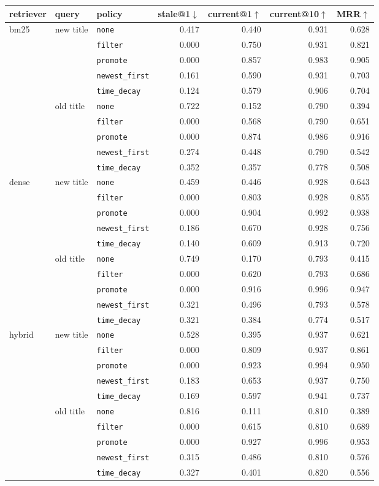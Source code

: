 \begin{tabular}{lllrrrr}
\toprule
retriever & query & policy & stale@1$\downarrow$ & current@1$\uparrow$ & current@10$\uparrow$ & MRR$\uparrow$ \\
\midrule
bm25 & new title & \texttt{none} & 0.417 & 0.440 & 0.931 & 0.628 \\
 &  & \texttt{filter} & 0.000 & 0.750 & 0.931 & 0.821 \\
 &  & \texttt{promote} & 0.000 & 0.857 & 0.983 & 0.905 \\
 &  & \texttt{newest\_first} & 0.161 & 0.590 & 0.931 & 0.703 \\
 &  & \texttt{time\_decay} & 0.124 & 0.579 & 0.906 & 0.704 \\
 & old title & \texttt{none} & 0.722 & 0.152 & 0.790 & 0.394 \\
 &  & \texttt{filter} & 0.000 & 0.568 & 0.790 & 0.651 \\
 &  & \texttt{promote} & 0.000 & 0.874 & 0.986 & 0.916 \\
 &  & \texttt{newest\_first} & 0.274 & 0.448 & 0.790 & 0.542 \\
 &  & \texttt{time\_decay} & 0.352 & 0.357 & 0.778 & 0.508 \\
\midrule
dense & new title & \texttt{none} & 0.459 & 0.446 & 0.928 & 0.643 \\
 &  & \texttt{filter} & 0.000 & 0.803 & 0.928 & 0.855 \\
 &  & \texttt{promote} & 0.000 & 0.904 & 0.992 & 0.938 \\
 &  & \texttt{newest\_first} & 0.186 & 0.670 & 0.928 & 0.756 \\
 &  & \texttt{time\_decay} & 0.140 & 0.609 & 0.913 & 0.720 \\
 & old title & \texttt{none} & 0.749 & 0.170 & 0.793 & 0.415 \\
 &  & \texttt{filter} & 0.000 & 0.620 & 0.793 & 0.686 \\
 &  & \texttt{promote} & 0.000 & 0.916 & 0.996 & 0.947 \\
 &  & \texttt{newest\_first} & 0.321 & 0.496 & 0.793 & 0.578 \\
 &  & \texttt{time\_decay} & 0.321 & 0.384 & 0.774 & 0.517 \\
\midrule
hybrid & new title & \texttt{none} & 0.528 & 0.395 & 0.937 & 0.621 \\
 &  & \texttt{filter} & 0.000 & 0.809 & 0.937 & 0.861 \\
 &  & \texttt{promote} & 0.000 & 0.923 & 0.994 & 0.950 \\
 &  & \texttt{newest\_first} & 0.183 & 0.653 & 0.937 & 0.750 \\
 &  & \texttt{time\_decay} & 0.169 & 0.597 & 0.941 & 0.737 \\
 & old title & \texttt{none} & 0.816 & 0.111 & 0.810 & 0.389 \\
 &  & \texttt{filter} & 0.000 & 0.615 & 0.810 & 0.689 \\
 &  & \texttt{promote} & 0.000 & 0.927 & 0.996 & 0.953 \\
 &  & \texttt{newest\_first} & 0.315 & 0.486 & 0.810 & 0.576 \\
 &  & \texttt{time\_decay} & 0.327 & 0.401 & 0.820 & 0.556 \\
\bottomrule
\end{tabular}
